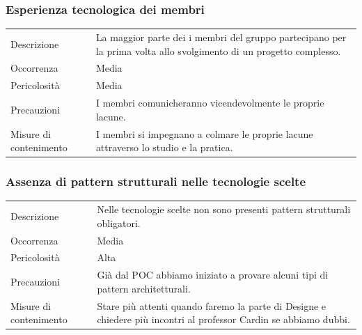 \documentclass{article}
\begin{document}
\subsubsection{Esperienza tecnologica dei membri}
\begin{center}
\begin{tabular}{P{10em} P{20em}} 
     Descrizione & La maggior parte dei i membri del gruppo partecipano per la prima volta allo svolgimento di un progetto complesso. \\ 
    Occorrenza & Media\\
    Pericolosità & Media \\
    Precauzioni & I membri comunicheranno vicendevolmente le proprie lacune.\\
    Misure di contenimento & I membri si impegnano a colmare le proprie lacune attraverso lo studio e la pratica. \\
\end{tabular}
\label{tab:esptec}
\end{center}

\subsubsection{Assenza di pattern strutturali nelle tecnologie scelte}
\begin{center}
\begin{tabular}{P{10em} P{20em}} 
     Descrizione & Nelle tecnologie scelte non sono presenti pattern strutturali obligatori. \\ 
    Occorrenza & Media\\
    Pericolosità & Alta \\
    Precauzioni & Già dal POC abbiamo iniziato a provare alcuni tipi di pattern architetturali.\\
    Misure di contenimento & Stare più attenti quando faremo la parte di Designe e chiedere più incontri al professor Cardin se abbiamo dubbi. \\
\end{tabular}
\label{tab:esptec}
\end{center}
\end{document}
